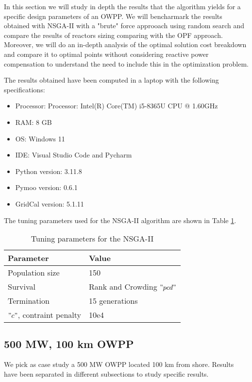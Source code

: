 \documentclass[a4paper,11pt, titlepage, twoside]{article}
\begin{document}
In this section we will study in depth the results that the algorithm yields for a specific design parameters
of an OWPP. We will bencharmark the results obtained with NSGA-II with a "brute" force approoach using random search and compare the results of reactors sizing comparing with the OPF
approach. Moreover, we will do an in-depth analysis of the optimal solution cost breakdown and compare it to optimal points without considering reactive power compensation to understand the need
to include this in the optimization problem.



The results obtained have been computed in a laptop with the following specifications:
\begin{itemize}
    \item Processor: Processor: Intel(R) Core(TM) i5-8365U CPU @ 1.60GHz
    \item RAM: 8 GB
    \item OS: Windows 11
    \item IDE: Visual Studio Code and Pycharm
    \item Python version: 3.11.8
    \item Pymoo version: 0.6.1
    \item GridCal version: 5.1.11
\end{itemize}

The tuning parameters used for the NSGA-II algorithm are shown in Table \ref{tab:NSGAII_parameters}.

\begin{table}[h]
\centering
    \begin{tabular}{l|l}
    \hline
    \textbf{Parameter} & \textbf{Value} \\ \hline
    Population size & 150 \\ \hline
    Survival & Rank and Crowding $"pcd"$ \\ \hline
    Termination  & 15 generations \\ \hline
    $"c"$, contraint penalty & 10e4 \\ \hline
    \end{tabular}
    \caption{Tuning parameters for the NSGA-II}
    \label{tab:NSGAII_parameters}
\end{table}


\subsection{500 MW, 100 km OWPP}

We pick as case study a 500 MW OWPP located 100 km from shore. Results have been separated in different subsections to study specific results.
\end{document}
